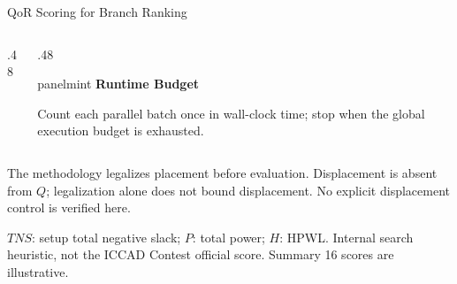 \documentclass[aspectratio=169,10pt]{beamer}
\newcommand{\smallpanel}[3]{%
  \begin{beamercolorbox}[rounded=true,sep=0.13cm,wd=\linewidth]{#1}%
    {\small\bfseries\color{Accent}#2}\par\vspace{0.06cm}
    {\scriptsize\color{Ink}#3}%
  \end{beamercolorbox}%
}
\begin{document}
\begin{frame}[shrink=12,label=detail-quality]{QoR Scoring for Branch Ranking}
\begin{columns}[T,onlytextwidth]
\begin{column}{.48\textwidth}
    \end{column}
    \begin{column}{.48\textwidth}
      \smallpanel{panelmint}{Runtime Budget}{Count each parallel batch once in wall-clock time; stop when the global execution budget is exhausted.}
    \end{column}
  \end{columns}
  \vspace{.14cm}
  {\scriptsize The methodology legalizes placement before evaluation. Displacement is absent from $Q$; legalization alone does not bound displacement. No explicit displacement control is verified here.}\par\vspace{.09cm}
  {\scriptsize\color{Muted}$TNS$: setup total negative slack; $P$: total power; $H$: HPWL. Internal search heuristic, not the ICCAD Contest official score. Summary 16 scores are illustrative.}

\end{frame}
\end{document}
